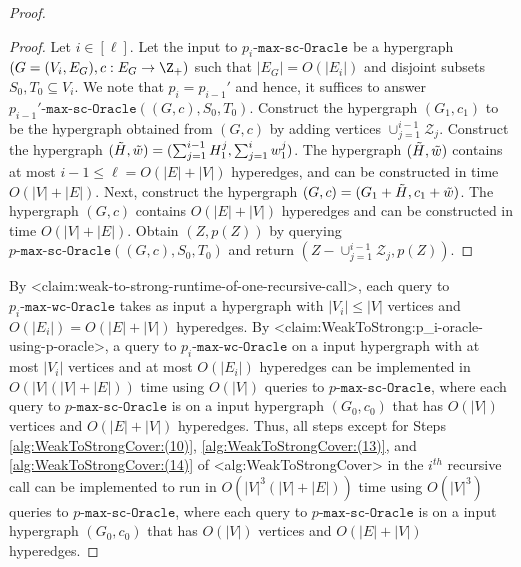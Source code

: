 \documentclass{article}
\def\Cref#1{<#1>}%
\newcommand{\zeros}{\ensuremath{\mathcal{Z}}\xspace}
\newcommand{\functionMaximizationOracle}[1]{\ensuremath{{#1}\text{-}\mathtt{max}\text{-}\mathtt{wc}\text{-}\mathtt{Oracle}}\xspace}
\newcommand{\functionMaximizationOracleStrongCover}[1]{\ensuremath{{#1}\text{-}\mathtt{max}\text{-}\mathtt{sc}\text{-}\mathtt{Oracle}}\xspace}
\begin{document}
\begin{proof}
\begin{proof}
Let $i\in [\ell]$. Let the input to \functionMaximizationOracleStrongCover{p_i} be a hypergraph $(G = (V_i, E_G), c:E_G\rightarrow\Z_+)$ such that $|E_G| = O(|E_i|)$ and disjoint subsets $S_0, T_0\subseteq V_i$. 
We note that $p_i=p_{i-1}'$ and hence, it suffices to answer $\functionMaximizationOracleStrongCover{p_{i-1}'}((G, c), S_0, T_0)$. 
Construct the hypergraph $(G_1, c_1)$ to be the hypergraph obtained from $(G,c)$ by adding vertices $\cup_{j=1}^{i-1}\zeros_{j}$. 
Construct the hypergraph $(\Tilde{H}, \Tilde{w})=(\sum_{j=1}^{i-1}H_1^j, \sum_{j=1}^i w_1^j)$. The hypergraph $(\Tilde{H}, \Tilde{w})$ contains at most $i - 1 \leq \ell = O(|E| + |V|)$ hyperedges, and can be constructed in time $O(|V|+|E|)$. 
Next, construct the hypergraph $(G, c)=(G_1+\Tilde{H}, c_1+\Tilde{w})$. The hypergraph $(G, c)$ contains $O(|E|+|V|)$ hyperedges and can be constructed in time $O(|V|+|E|)$. 
Obtain $(Z, p(Z))$ by querying $\functionMaximizationOracleStrongCover{p}((G, c), S_0, T_0)$ and return $(Z-\cup_{j=1}^{i-1}\zeros_{j}, p(Z))$. 
\end{proof}

By \Cref{claim:weak-to-strong-runtime-of-one-recursive-call}, each query to \functionMaximizationOracle{p_i} takes as input a hypergraph with $|V_i|\le |V|$ vertices and $O(|E_i|) = O(|E|+|V|)$ hyperedges. 
By \Cref{claim:WeakToStrong:p_i-oracle-using-p-oracle}, a query to \functionMaximizationOracle{p_i} on a input hypergraph with at most $|V_i|$ vertices and at most $O(|E_i|)$ hyperedges 
can be implemented in $O(|V|(|V| + |E|))$  time using $O(|V|)$ queries to \functionMaximizationOracleStrongCover{p}, where each query to \functionMaximizationOracleStrongCover{p} is on a input hypergraph $(G_0, c_0)$ that has $O(|V|)$ vertices and $O(|E|+|V|)$ hyperedges. 
Thus, all steps except for Steps \ref{alg:WeakToStrongCover:(10)}, \ref{alg:WeakToStrongCover:(13)}, and \ref{alg:WeakToStrongCover:(14)} of \Cref{alg:WeakToStrongCover} in the $i^{th}$ recursive call can be implemented to run in $O(|V|^3(|V| + |E|))$ time using $O(|V|^3)$ queries to \functionMaximizationOracleStrongCover{p}, where each query to \functionMaximizationOracleStrongCover{p} is on a input hypergraph $(G_0, c_0)$ that has $O(|V|)$ vertices and $O(|E|+|V|)$ hyperedges. 


\end{proof}
\end{document}
